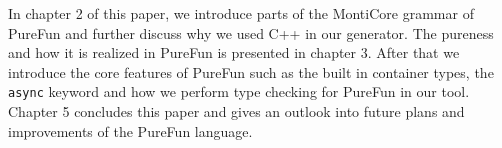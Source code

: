 In chapter 2 of this paper, we introduce parts of the MontiCore grammar of PureFun and further discuss why we used C++ in our generator. The pureness and how it is realized in PureFun is presented in chapter 3. After that we introduce the core features of PureFun such as the built in container types, the \texttt{async}{} keyword and how we perform type checking for PureFun in our tool. Chapter 5 concludes this paper and gives an outlook into future plans and improvements of the PureFun language.